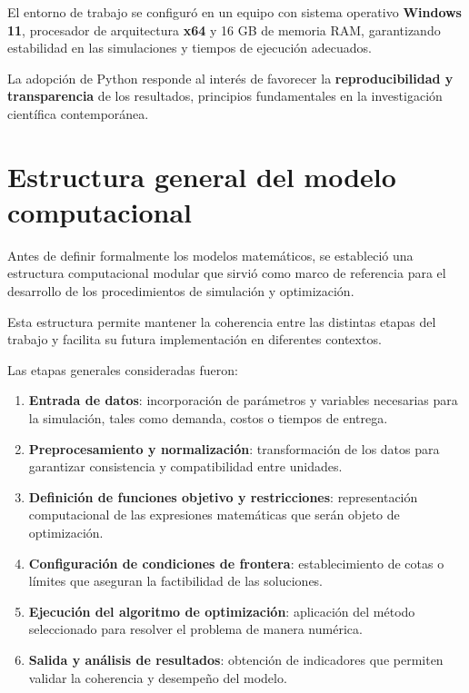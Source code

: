 \documentclass[
  spanish,
  us-letterpaper,
]{scrreprt}
\providecommand{\tightlist}{%
  \setlength{\itemsep}{0pt}\setlength{\parskip}{0pt}}
\numberwithin{equation}{section}
\begin{document}
El entorno de trabajo se configuró en un equipo con sistema operativo
\textbf{Windows 11}, procesador de arquitectura \textbf{x64} y 16 GB de
memoria RAM, garantizando estabilidad en las simulaciones y tiempos de
ejecución adecuados.

La adopción de Python responde al interés de favorecer la
\textbf{reproducibilidad y transparencia} de los resultados, principios
fundamentales en la investigación científica contemporánea.

\section{Estructura general del modelo
computacional}\label{estructura-general-del-modelo-computacional}

Antes de definir formalmente los modelos matemáticos, se estableció una
estructura computacional modular que sirvió como marco de referencia
para el desarrollo de los procedimientos de simulación y optimización.

Esta estructura permite mantener la coherencia entre las distintas
etapas del trabajo y facilita su futura implementación en diferentes
contextos.

Las etapas generales consideradas fueron:

\begin{enumerate}
\def\labelenumi{\arabic{enumi}.}
\tightlist
\item
  \textbf{Entrada de datos}: incorporación de parámetros y variables
  necesarias para la simulación, tales como demanda, costos o tiempos de
  entrega.\\
\item
  \textbf{Preprocesamiento y normalización}: transformación de los datos
  para garantizar consistencia y compatibilidad entre unidades.\\
\item
  \textbf{Definición de funciones objetivo y restricciones}:
  representación computacional de las expresiones matemáticas que serán
  objeto de optimización.\\
\item
  \textbf{Configuración de condiciones de frontera}: establecimiento de
  cotas o límites que aseguran la factibilidad de las soluciones.\\
\item
  \textbf{Ejecución del algoritmo de optimización}: aplicación del
  método seleccionado para resolver el problema de manera numérica.\\
\item
  \textbf{Salida y análisis de resultados}: obtención de indicadores que
  permiten validar la coherencia y desempeño del modelo.
\end{enumerate}
\end{document}
